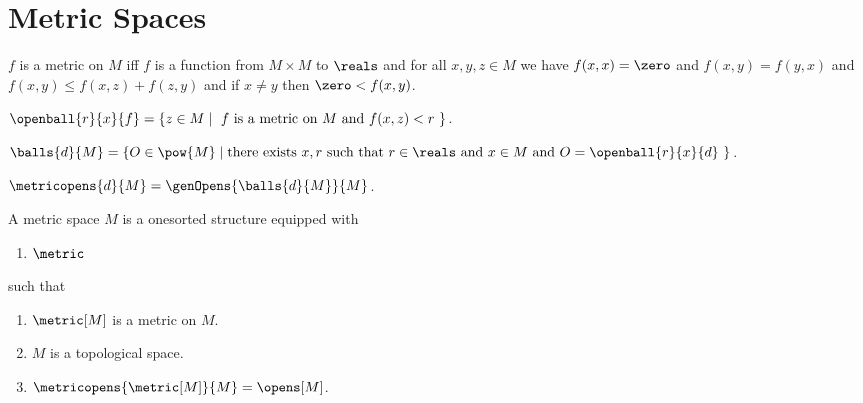 





\section{Metric Spaces}\label{form_sec_metric}

\begin{definition}\label{metric}
    $f$ is a metric on $M$ iff $f$ is a function from $M \times M$ to $\reals$ and
    for all $x,y,z \in M$ we have 
        $f(x,x) = \zero$ and 
        $f(x,y) = f(y,x)$ and
        $f(x,y) \leq f(x,z) + f(z,y)$ and
        if $x \neq y$ then $\zero < f(x,y)$.
\end{definition}

\begin{definition}\label{open_ball}
    $\openball{r}{x}{f} = \{z \in M \mid \text{ $f$ is a metric on $M$ and $f(x,z) < r$ } \}$.
\end{definition}



\begin{definition}\label{set_of_balls}
    $\balls{d}{M} = \{ O \in \pow{M} \mid \text{there exists $x,r$ such that $r \in \reals$ and $x \in M$ and $O = \openball{r}{x}{d}$ } \}$.
\end{definition}


\begin{definition}\label{metricopens}
    $\metricopens{d}{M} = \genOpens{\balls{d}{M}}{M}$.
\end{definition}







\begin{struct}\label{metric_space}  
    A metric space $M$ is a onesorted structure equipped with
    \begin{enumerate}
        \item $\metric$
    \end{enumerate}
    such that
    \begin{enumerate}
        \item \label{metric_space_metric}                   $\metric[M]$ is a metric on $M$.
        \item \label{metric_space_topology}                 $M$ is a topological space.
        \item \label{metric_space_opens}                    $\metricopens{ \metric[M] }{M} = \opens[M]$.
    \end{enumerate}
\end{struct}

